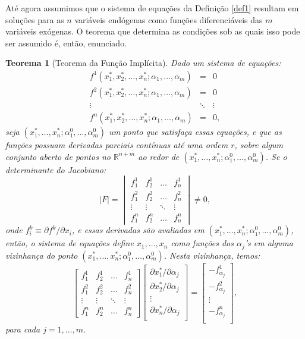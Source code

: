 \documentclass[12pt]{article}
\newtheorem{teo}{Teorema}
\begin{document}
Até agora assumimos que o sistema de equações da Definição \ref{def1} resultam em soluções para as $n$ variáveis endógenas como funções diferenciáveis das $m$ variáveis exógenas. O teorema que determina as condições sob as quais isso pode ser assumido é, então, enunciado.

\begin{teo}[Teorema da Função Implícita]

    Dado um sistema de equações:
    \begin{eqnarray*}
        f^1(x_1^*, x_2^*, \dots, x_n^*; \alpha_1, \dots, \alpha_m) &=& 0 \\
    f^2(x_1^*, x_2^*, \dots, x_n^*; \alpha_1, \dots, \alpha_m) &=& 0 \\
    \vdots &\ddots & \vdots \\
    f^n(x_1^*, x_2^*, \dots, x_n^*; \alpha_1, \dots, \alpha_m) &=& 0,
    \end{eqnarray*}
    seja $(x_1^*, \dots, x_n^*; \alpha_1^0, \dots, \alpha_m^0)$ um ponto que satisfaça essas equações, e que as funções possuam derivadas parciais contínuas até uma ordem $r$, sobre algum conjunto aberto de pontos no $\mathbb{R}^{n+m}$ ao redor de $(x_1^*, \dots, x_n^*; \alpha_1^0, \dots, \alpha_m^0)$. Se o determinante do Jacobiano:
    \[
|F| = \begin{vmatrix}
    f_1^1 & f_2^1 & \dots & f_n^1 \\
    f_1^2 & f_2^2 & \dots & f_n^2 \\
    \vdots & \vdots & \ddots & \vdots \\
    f_1^n & f_2^n & \dots & f_n^n
\end{vmatrix} \neq 0,
    \]
    onde $f_i^k \equiv \partial f^k/\partial x_i$, e essas derivadas são avaliadas em $(x_1^*, \dots, x_n^*; \alpha_1^0, \dots, \alpha_m^0)$, então, o sistema de equações define $x_1, \dots, x_n$ como funções dos $\alpha_j$'s em alguma vizinhança do ponto  $(x_1^*, \dots, x_n^*; \alpha_1^0, \dots, \alpha_m^0)$. Nesta vizinhança, temos:
    \[
\begin{bmatrix}
    f_1^1 & f_2^1 & \dots & f_n^1 \\
    f_1^2 & f_2^2 & \dots & f_n^2 \\
    \vdots & \vdots & \ddots & \vdots \\
    f_1^n & f_2^n & \dots & f_n^n
\end{bmatrix}\begin{bmatrix}
    \partial{x_1^*}/\partial \alpha_j \\
    \partial{x_2^*}/\partial \alpha_j \\
    \vdots \\
    \partial{x_n^*}/\partial \alpha_j \\
\end{bmatrix} = \begin{bmatrix}
    -f_{\alpha_j}^1 \\
    -f_{\alpha_j}^2 \\
    \vdots \\
    -f_{\alpha_j}^n \\
\end{bmatrix},
    \]
    para cada $j = 1, \dots, m$.
\end{teo}
\end{document}
